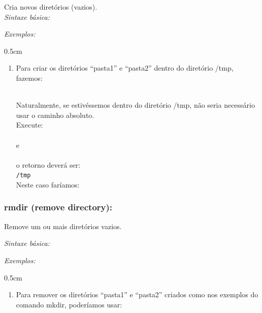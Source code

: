 \begin{refsection}
 Cria novos diretórios (vazios).\\

 \textit{Sintaxe básica:}


\textit{Exemplos:}
 \begin {myindentpar}{0.5cm}
 \begin{enumerate}[\itshape i.]
 \item{Para criar os diretórios ``pasta1'' e ``pasta2'' dentro do diretório /tmp, fazemos:}

 \\
Naturalmente, se estivéssemos dentro do diretório /tmp, não seria necessário usar o caminho absoluto.\\
Execute:\\
 \\
e\\
 \\
o retorno deverá ser:\\
 \texttt{/tmp}\\
Neste caso faríamos:\\
\end{enumerate}
\end{myindentpar}

\subsubsection{rmdir (remove directory):}\label{tut1:text_mode:commands:rmdir}

 Remove um ou mais diretórios vazios.

 \textit{Sintaxe básica:}


\textit{Exemplos:}
\begin {myindentpar}{0.5cm}
\begin{enumerate}[\itshape i.]

 \item{Para remover os diretórios ``pasta1'' e ``pasta2'' criados como nos exemplos do comando mkdir, poderíamos usar:}


\end{enumerate}
\end{myindentpar}


\end{refsection}
